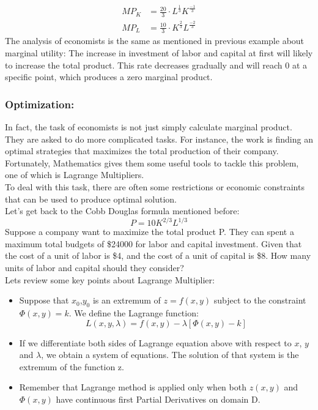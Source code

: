 \documentclass[a4paper]{article}
\begin{document}
	\begin{align*}
	MP_K &= \frac{20}{3} \cdot L^{\frac{1}{3}} K^{\frac{-1}{3}} \\
	MP_L &= \frac{10}{3} \cdot K^{\frac{2}{3}} L^{\frac{-2}{3}} 
	\end{align*}
	The analysis of economists is the same as mentioned in previous example about marginal utility: The increase in investment of labor and capital at first will likely to increase the total product. This rate decreases gradually and will reach 0 at a specific point, which produces a zero marginal product. \\
	\subsubsection*{Optimization:}
	In fact, the task of economists is not just simply calculate marginal product. They are asked to do more complicated tasks. For instance, the work is finding an optimal strategies that maximizes the total production of their company. \\
	Fortunately, Mathematics gives them some useful tools to tackle this problem, one of which is Lagrange Multipliers. \\
	To deal with this task, there are often some restrictions or economic constraints that can be used to produce optimal solution.\\
	Let’s get back to the Cobb Douglas formula mentioned before:
	\begin{equation*}
	P = 10K^{2/3}L^{1/3}
	\end{equation*}
	Suppose a company want to maximize the total product P. They can spent a maximum total budgets of \$24000 for labor and capital investment. Given that the cost of a unit of labor is \$4, and the cost of a unit of capital is \$8.  How many units of labor and capital should they consider? \\
	Lets review some key points about Lagrange Multiplier: \\
	\begin{itemize}
		\item Suppose that $x_0$,$y_0$ is an extremum of $z = f(x,y)$ subject to the constraint $\Phi(x,y) = k$. We define the Lagrange function:
		\begin{equation*}
		L(x,y,\lambda) = f(x,y) - \lambda[\Phi(x,y) - k]
		\end{equation*}
		\item If we differentiate both sides of Lagrange equation above with respect to $x$, $y$ and $\lambda$, we obtain a system of equations. The solution of that system is the extremum of the function z.
		\item Remember that Lagrange method is applied only when both $z(x,y)$ and $\Phi(x,y)$ have continuous first Partial Derivatives on domain D.
	\end{itemize}
\end{document}
